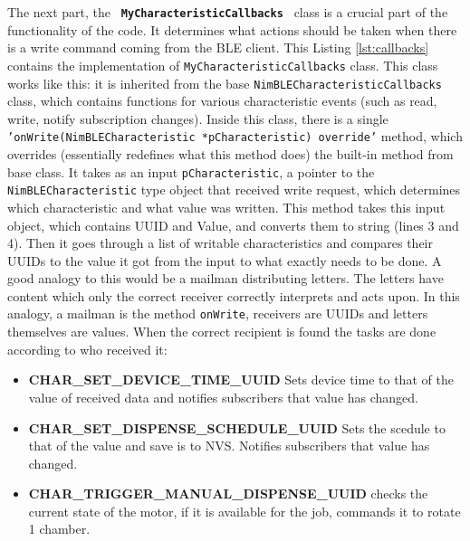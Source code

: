 The next part, the \texttt{ \textbf{MyCharacteristicCallbacks} } class is a crucial part of the functionality of the code. It determines what actions should be taken when there is a write command coming from the \ac{BLE} client. This Listing \ref{lst:callbacks} contains the implementation of \texttt{MyCharacteristicCallbacks} class. This class works like this: it is inherited from the base \texttt{NimBLECharacteristicCallbacks} class, which contains functions for various characteristic events (such as read, write, notify subscription changes). Inside this class, there is a single \texttt{'onWrite(NimBLECharacteristic *pCharacteristic) override'} method, which overrides (essentially redefines what this method does) the built-in method from base class. It takes as an input \texttt{pCharacteristic}, a pointer to the \texttt{NimBLECharacteristic} type object that received write request, which determines which characteristic and what value was written. This method takes this input object, which contains \ac{UUID} and Value, and converts them to string (lines 3 and 4). Then it goes through a list of writable characteristics and compares their \ac{UUID}s to the value it got from the input to what exactly needs to be done. A good analogy to this would be a mailman distributing letters. The letters have content which only the correct receiver correctly interprets and acts upon. In this analogy, a mailman is the method \texttt{onWrite}, receivers are \ac{UUID}s and letters themselves are values. When the correct recipient is found the tasks are done according to who received it:
\begin{itemize}
	\item \textbf{CHAR\_SET\_DEVICE\_TIME\_UUID} Sets device time to that of the value of received data and notifies subscribers that value has changed.
	\item \textbf{CHAR\_SET\_DISPENSE\_SCHEDULE\_UUID} Sets the scedule to that of the value and save is to \ac{NVS}. Notifies subscribers that value has changed.
	\item \textbf{CHAR\_TRIGGER\_MANUAL\_DISPENSE\_UUID} checks the current state of the motor, if it is available for the job, commands it to rotate 1 chamber.
\end{itemize}
